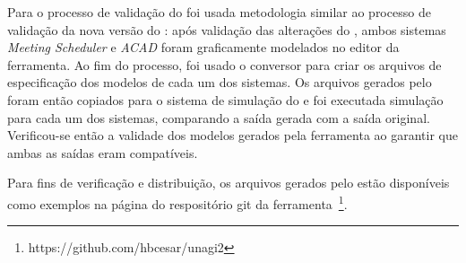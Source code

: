 Para o processo de validação do \unagi foi usada metodologia similar ao processo de validação da nova versão do \zanshin: após validação das alterações do \framework, ambos sistemas \textit{Meeting Scheduler} e \textit{ACAD} foram graficamente modelados no editor da ferramenta. Ao fim do processo, foi usado o conversor para criar os arquivos \xml de especificação dos modelos de cada um dos sistemas. 
Os arquivos gerados pelo \unagi foram então copiados para o sistema de simulação do \zanshin e foi executada simulação para cada um dos sistemas, comparando a saída gerada com a saída original. Verificou-se então a validade dos modelos gerados pela ferramenta ao garantir que ambas as saídas eram compatíveis.

Para fins de verificação e distribuição, os arquivos gerados pelo \unagi estão disponíveis como exemplos na página do respositório git da ferramenta~\footnote{https://github.com/hbcesar/unagi2}.